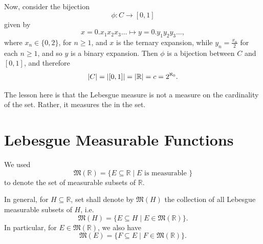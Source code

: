 \documentclass[notoc,notitlepage]{tufte-book}
\begin{document}
\begin{eg}
  Now, consider the bijection
  \begin{equation*}
    \phi : C \to [0, 1]
  \end{equation*}
  given by
  \begin{equation*}
    x = 0.x_1 x_2 x_3 \hdots \mapsto y = 0.y_1 y_2 y_3 \hdots,
  \end{equation*}
  where $x_n \in \{0, 2\}$, for $n \geq 1$, and $x$ is the ternary expansion,
  while $y_n = \frac{x_n}{2}$ for each $n \geq 1$, and so $y$ is a binary
  expansion. Then $\phi$ is a bijection between $C$ and $[0, 1]$, and therefore
  \begin{equation*}
    \left|C\right| = \left|[0, 1]\right| = \left|\mathbb{R}\right| = c = 2^{\aleph_0}.
  \end{equation*}
\end{eg}

\begin{note}
  The lesson here is that the Lebesgue measure is not a measure on the
  cardinality of the set. Rather, it measures the  in the set.
\end{note}


\section{Lebesgue Measurable Functions}%
\label{sec:lebesgue_measurable_functions}

\begin{note}
  We used
  \begin{equation*}
    \mathfrak{M}(\mathbb{R}) = \{ E \subseteq \mathbb{R} \mid E \text{ is
    measurable } \}
  \end{equation*}
  to denote the set of measurable subsets of $\mathbb{R}$.

  In general, for $H \subseteq \mathbb{R}$, set shall denote by
  $\mathfrak{M}(H)$ the collection of all Lebesgue measurable subsets of $H$,
  i.e.
  \begin{equation*}
    \mathfrak{M}(H) = \{ E \subseteq H \mid E \in \mathfrak{M}(\mathbb{R}) \}.
  \end{equation*}
  In particular, for $E \in \mathfrak{M}(\mathbb{R})$, we also have
  \begin{equation*}
    \mathfrak{M}(E) = \{ F \subseteq E \mid F \in \mathfrak{M}(\mathbb{R}) \}.
  \end{equation*}
\end{note}
\end{document}
